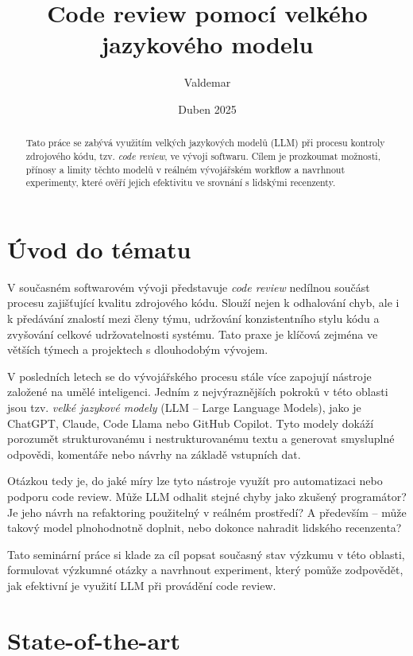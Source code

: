 \documentclass[12pt, a4paper]{article}
\title{Code review pomocí velkého jazykového modelu}
\author{Valdemar}
\date{Duben 2025}
\begin{document}
\maketitle

\begin{abstract}
Tato práce se zabývá využitím velkých jazykových modelů (LLM) při procesu kontroly zdrojového kódu, tzv. \textit{code review}, ve vývoji softwaru. Cílem je prozkoumat možnosti, přínosy a limity těchto modelů v reálném vývojářském workflow a navrhnout experimenty, které ověří jejich efektivitu ve srovnání s lidskými recenzenty.
\end{abstract}

\section{Úvod do tématu}

V současném softwarovém vývoji představuje \textit{code review} nedílnou součást procesu zajišťující kvalitu zdrojového kódu. Slouží nejen k odhalování chyb, ale i k předávání znalostí mezi členy týmu, udržování konzistentního stylu kódu a zvyšování celkové udržovatelnosti systému. Tato praxe je klíčová zejména ve větších týmech a projektech s dlouhodobým vývojem.

V posledních letech se do vývojářského procesu stále více zapojují nástroje založené na umělé inteligenci. Jedním z nejvýraznějších pokroků v této oblasti jsou tzv. \textit{velké jazykové modely} (LLM – Large Language Models), jako je ChatGPT, Claude, Code Llama nebo GitHub Copilot. Tyto modely dokáží porozumět strukturovanému i nestrukturovanému textu a generovat smysluplné odpovědi, komentáře nebo návrhy na základě vstupních dat.

Otázkou tedy je, do jaké míry lze tyto nástroje využít pro automatizaci nebo podporu code review. Může LLM odhalit stejné chyby jako zkušený programátor? Je jeho návrh na refaktoring použitelný v reálném prostředí? A především – může takový model plnohodnotně doplnit, nebo dokonce nahradit lidského recenzenta?

Tato seminární práce si klade za cíl popsat současný stav výzkumu v této oblasti, formulovat výzkumné otázky a navrhnout experiment, který pomůže zodpovědět, jak efektivní je využití LLM při provádění code review.

\newpage



\section{State-of-the-art}
\end{document}
